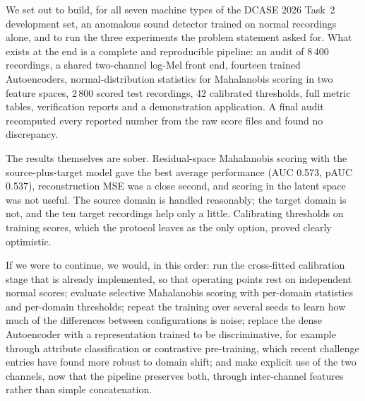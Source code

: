 We set out to build, for all seven machine types of the DCASE 2026 Task~2 development set, an anomalous sound detector trained on normal recordings alone, and to run the three experiments the problem statement asked for. What exists at the end is a complete and reproducible pipeline: an audit of 8\,400 recordings, a shared two-channel log-Mel front end, fourteen trained Autoencoders, normal-distribution statistics for Mahalanobis scoring in two feature spaces, 2\,800 scored test recordings, 42 calibrated thresholds, full metric tables, verification reports and a demonstration application. A final audit recomputed every reported number from the raw score files and found no discrepancy.

The results themselves are sober. Residual-space Mahalanobis scoring with the source-plus-target model gave the best average performance (AUC 0.573, pAUC 0.537), reconstruction MSE was a close second, and scoring in the latent space was not useful. The source domain is handled reasonably; the target domain is not, and the ten target recordings help only a little. Calibrating thresholds on training scores, which the protocol leaves as the only option, proved clearly optimistic.

If we were to continue, we would, in this order: run the cross-fitted calibration stage that is already implemented, so that operating points rest on independent normal scores; evaluate selective Mahalanobis scoring with per-domain statistics and per-domain thresholds; repeat the training over several seeds to learn how much of the differences between configurations is noise; replace the dense Autoencoder with a representation trained to be discriminative, for example through attribute classification or contrastive pre-training, which recent challenge entries have found more robust to domain shift; and make explicit use of the two channels, now that the pipeline preserves both, through inter-channel features rather than simple concatenation.
